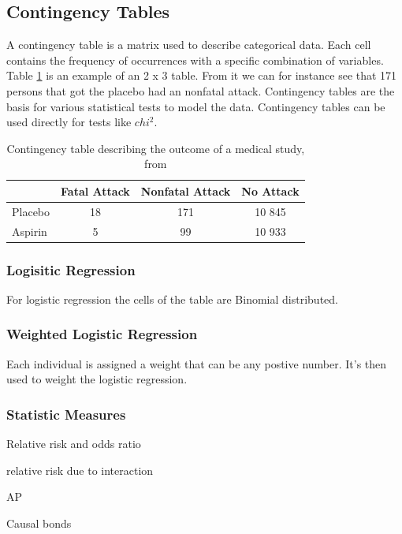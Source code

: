 \documentclass[10pt,a4paper]{report}
\begin{document}
\subsection{Contingency Tables}
A contingency table is a matrix used to describe categorical data. Each cell contains the frequency of occurrences with a specific combination of variables. Table \ref{table:contingency_table} is an example of an 2 x 3 table. From it we can for instance see that 171 persons that got the placebo had an nonfatal attack. Contingency tables are the basis for various statistical tests to model the data. Contingency tables can be used directly for tests like $chi^2$.\cite{agresti_categorical}

\begin{table}[h]
\begin{tabular}{ l c c c }
  \hline
  & Fatal Attack & Nonfatal Attack & No Attack\\
  \hline
  Placebo & 18 & 171 & 10 845 \\
  Aspirin & 5 & 99 & 10 933 \\
  \hline  
\end{tabular}
\caption{Contingency table describing the outcome of a medical study, from \cite{agresti_categorical}}
\label{table:contingency_table}
\end{table}

\subsubsection{Logisitic Regression}
For logistic regression the cells of the table are Binomial distributed.\cite{agresti_categorical}

\subsubsection{Weighted Logistic Regression}
Each individual is assigned a weight that can be any postive number. It's then used to weight the logistic regression.

\subsubsection{Statistic Measures}
Relative risk and odds ratio\cite{agresti_categorical}

relative risk due to interaction

AP

Causal bonds\cite{causal_bounds_arvid}

\end{document}
